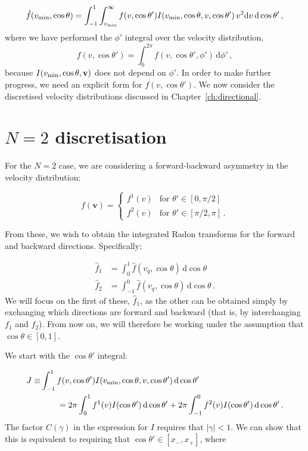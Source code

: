 \begin{equation}
\hat{f}(\vmin, \cos\theta) = \int_{-1}^{1} \int_{\vmin}^{\infty}  f(v, \cos\theta') I(\vmin, \cos\theta, v, \cos\theta')\, v^2 \mathrm{d}v\, \mathrm{d}\cos\theta'\,,
\end{equation}
where we have performed the $\phi'$ integral over the velocity distribution,
\begin{equation}
f(v, \cos\theta') = \int_{0}^{2\pi} f(v, \cos\theta', \phi') \, \mathrm{d}\phi'\,,
\end{equation}
because $I(\vmin, \cos\theta, \mathbf{v})$ does not depend on $\phi'$. In order to make further progress, we need an explicit form for $f(v, \cos\theta')$. We now consider the discretised velocity distributions discussed in Chapter~\ref{ch:directional}.


\section{$N=2$ discretisation}

For the $N=2$ case, we are considering a forward-backward asymmetry in the velocity distribution:

\begin{equation}
\label{eq:RadonCalc:N2}
f(\mathbf{v}) =
\begin{cases}
f^1(v) & \textrm{for } \theta' \in [0, \pi/2] \\
f^2(v) & \textrm{for } \theta' \in [\pi/2, \pi]\,.
\end{cases}
\end{equation}

From these, we wish to obtain the integrated Radon transforms for the forward and backward directions. Specifically:

\begin{align}
\hat{f}_1 &= \int_{0}^1 \hat{f}(v_q,\cos\theta) \, \mathrm{d}\cos\theta \\
\hat{f}_2 &= \int_{-1}^0 \hat{f}(v_q, \cos\theta) \, \mathrm{d}\cos\theta \,.
\end{align}
We will focus on the first of these, $\hat{f}_1$, as the other can be obtained simply by exchanging which directions are forward and backward (that is, by interchanging $f_1$ and $f_2$). From now on, we will therefore be working under the assumption that $\cos\theta \in [0,1]$.

We start with the $\cos\theta'$ integral:

\begin{align}
\label{eq:RadonCalc:J}
J \equiv &\int_{-1}^{1} f(v, \cos\theta')I(\vmin, \cos\theta, v, \cos\theta') \, \mathrm{d}\cos\theta' \nonumber\\
&\qquad = 2\pi\int_0^1 f^1(v) I(\cos\theta') \, \mathrm{d}\cos\theta' + 2\pi\int_{-1}^0 f^2(v) I(\cos\theta') \, \mathrm{d}\cos\theta'\,.
\end{align}
The factor $C(\gamma)$ in the expression for $I$ requires that $|\gamma| < 1$. We can show that this is equivalent to requiring that $\cos\theta' \in [x_-, x_+]$, where

